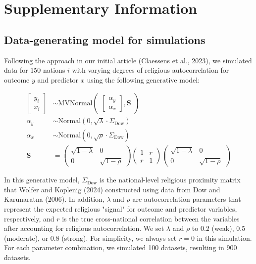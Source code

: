 \newpage

\section*{Supplementary Information}

\subsection*{Data-generating model for simulations}

Following the approach in our initial article (Claessens et al., 2023), we 
simulated data for 150 nations $i$ with varying degrees of religious 
autocorrelation for outcome $y$ and predictor $x$ using the following
generative model:

\begin{align}
\begin{bmatrix}y_i\\x_i \end{bmatrix} &\sim \text{MVNormal}
\begin{pmatrix}\begin{bmatrix}\alpha_y\\\alpha_x \end{bmatrix},
\textbf{S}\end{pmatrix} \nonumber \\
\alpha_y &\sim \text{Normal}(0, \sqrt{\lambda} \cdot \Sigma_\text{Dow}) 
\nonumber \\
\alpha_x &\sim \text{Normal}(0, \sqrt{\rho} \cdot \Sigma_\text{Dow}) 
\nonumber \\
\textbf{S} &= 
\begin{pmatrix}\sqrt{1 - \lambda} & 0 \\ 0 & \sqrt{1 - \rho} \end{pmatrix}
\begin{pmatrix}1 & r \\ r & 1\end{pmatrix}
\begin{pmatrix}\sqrt{1 - \lambda} & 0 \\ 0 & \sqrt{1 - \rho} \end{pmatrix} 
\nonumber
\end{align}

In this generative model, $\Sigma_\text{Dow}$ is the national-level religious
proximity matrix that Wolfer and Koplenig (2024) constructed using data from Dow
and Karunaratna (2006). In addition, $\lambda$ and $\rho$ are autocorrelation 
parameters that represent the expected religious "signal" for outcome and 
predictor variables, respectively, and $r$ is the true cross-national 
correlation between the variables after accounting for religious
autocorrelation. We set $\lambda$ and $\rho$ to 0.2 (weak), 0.5 (moderate), or 
0.8 (strong). For simplicity, we always set $r = 0$ in this simulation. For each
parameter combination, we simulated 100 datasets, resulting in 900 datasets.

